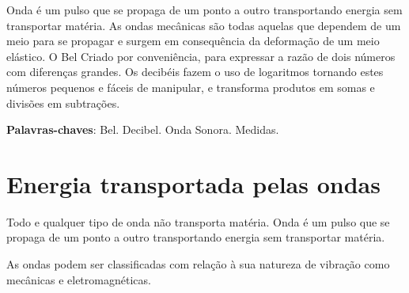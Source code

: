 \documentclass[
	article,			%
	11pt,				%
	oneside,			%
	a4paper,			%
	english,			%
	brazil,				%
	sumario=tradicional
	]{abntex2}
\begin{document}
\frenchspacing 


%
%
\maketitle
\begin{resumoumacoluna}
    Onda é um pulso que se propaga de um ponto a outro transportando energia sem transportar matéria. As ondas mecânicas são todas aquelas que dependem de um meio para se propagar e surgem em consequência da deformação de um meio elástico.
    O Bel Criado por conveniência, para expressar a razão de dois números com diferenças grandes.
    Os decibéis fazem o uso de logaritmos tornando estes números pequenos e fáceis de manipular, e transforma produtos em somas e divisões em subtrações.
 
 \vspace{\onelineskip}
 
 \noindent
 \textbf{Palavras-chaves}: Bel. Decibel. Onda Sonora. Medidas.
\end{resumoumacoluna}


\textual

\section*{Energia transportada pelas ondas}

Todo e qualquer tipo de onda não transporta matéria. Onda é um pulso que se propaga de um ponto a outro transportando energia sem transportar matéria.

As ondas podem ser classificadas com relação à sua natureza de vibração como mecânicas e eletromagnéticas.
\end{document}
